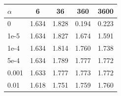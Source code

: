 \begin{tabular}{l c c c c}
\toprule
$\alpha$ & 6 & 36 & 360 & 3600 \\
\midrule
0 & 1.634 & 1.828 & 0.194 & 0.223 \\
1e-5 & 1.634 & 1.827 & 1.674 & 1.591 \\
1e-4 & 1.634 & 1.814 & 1.760 & 1.738 \\
5e-4 & 1.634 & 1.789 & 1.777 & 1.772 \\
0.001 & 1.633 & 1.777 & 1.773 & 1.772 \\
0.01 & 1.618 & 1.751 & 1.759 & 1.760 \\
\bottomrule
\end{tabular}